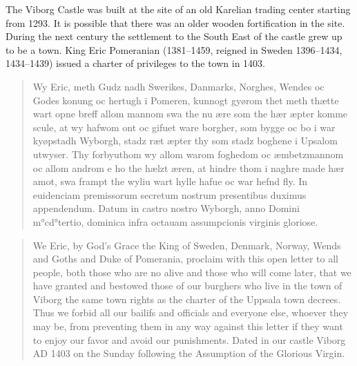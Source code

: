 \documentclass[a4paper]{article}
\begin{document}
The Viborg Castle was built at the site of an old Karelian trading
center starting from 1293. It is possible that there was an older
wooden fortification in the site. During the next century the
settlement to the South East of the castle grew up to be a town. King
Eric Pomeranian (1381–1459, reigned in Sweden 1396–1434, 1434–1439)
issued a charter of privileges to the town in 1403.


\begin{quote}
  
Wy Eric, meth Gudz nadh Swerikes, Danmarks, Norghes, Wendes oc Godes
konung oc hertugh i Pomeren, kunnogt gyørom thet meth thætte wart opne
breff allom mannom swa the nu ære som the hær æpter komme scule, at wy
hafwom ont oc gifuet ware borgher, som bygge oc bo i war kyøpstadh
Wyborgh, stadz ræt æpter thy som stadz boghene i Upsalom utwyser. Thy
forbyuthom wy allom warom foghedom oc æmbetzmannom oc allom androm e
ho the hælzt æren, at hindre thom i naghre made hær amot, swa frampt
the wyliu wart hylle hafue oc war hefnd fly. In euidenciam premissorum
secretum nostrum presentibus duximus appendendum. Datum in castro
nostro Wyborgh, anno Domini m°cd°tertio, dominica infra octauam
assumpcionis virginis gloriose.

\end{quote}


\begin{quote}
  We Eric, by God's Grace the King of Sweden, Denmark, Norway, Wends
  and Goths and Duke of Pomerania, proclaim with this open letter to
  all people, both those who are no alive and those who will come
  later, that we have granted and bestowed those of our burghers who
  live in the town of Viborg the same town rights as the charter of
  the Uppsala town decrees. Thus we forbid all our bailifs and
  officials and everyone else, whoever they may be, from preventing
  them in any way against this letter if they want to enjoy our favor
  and avoid our punishments. Dated in our castle Viborg AD 1403 on the
  Sunday following the Assumption of the Glorious Virgin.
\end{quote}
\end{document}
